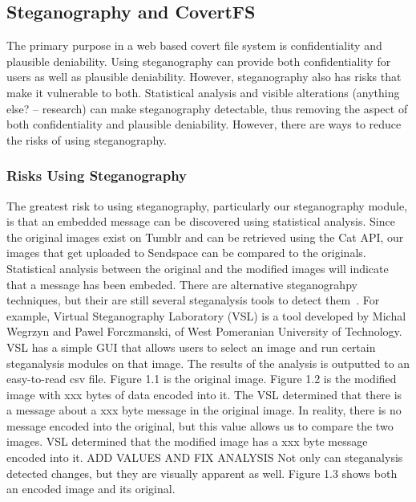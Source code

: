 \subsection{Steganography and CovertFS}
The primary purpose in a web based covert file system is confidentiality and plausible deniability. Using steganography can provide both confidentiality for users as well as plausible deniability. However, steganography also has risks that make it vulnerable to both. Statistical analysis and visible alterations (anything else? -- research) can make steganography detectable, thus removing the aspect of both confidentiality and plausible deniability. However, there are ways to reduce the risks of using steganography. 

\subsubsection{Risks Using Steganography}

The greatest risk to using steganography, particularly our steganography module, is that an embedded message can be discovered using statistical analysis. Since the original images exist on Tumblr and can be retrieved using the Cat API, our images that get uploaded to Sendspace can be compared to the originals. Statistical analysis between the original and the modified images will indicate that a message has been embeded. There are alternative steganograhpy techniques, but their are still several steganalysis tools to detect them~\cite{Laden}. For example, Virtual Steganography Laboratory (VSL) is a tool developed by Michal Wegrzyn and Pawel Forczmanski, of West Pomeranian University of Technology. VSL has a simple GUI that allows users to select an image and run certain steganalysis modules on that image. The results of the analysis is outputted to an easy-to-read csv file. Figure 1.1 is the original image. Figure 1.2 is the modified image with xxx bytes of data encoded into it. 
The VSL determined that there is a message about a xxx byte message in the original image. In reality, there is no message encoded into the original, but this value allows us to compare the two images. VSL determined that the modified image has a xxx byte message encoded into it. ADD VALUES AND FIX ANALYSIS Not only can steganalysis detected changes, but they are visually apparent as well. Figure 1.3 shows both an encoded image and its original.

